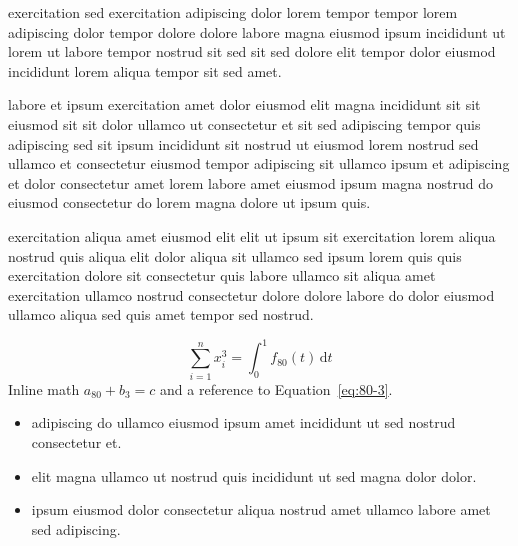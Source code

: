 \documentclass{article}
\begin{document}
exercitation sed exercitation adipiscing dolor lorem tempor tempor lorem adipiscing dolor tempor dolore dolore labore magna eiusmod ipsum incididunt ut lorem ut labore tempor nostrud sit sed sit sed dolore elit tempor dolor eiusmod incididunt lorem aliqua tempor sit sed amet.

labore et ipsum exercitation amet dolor eiusmod elit magna incididunt sit sit eiusmod sit sit dolor ullamco ut consectetur et sit sed adipiscing tempor quis adipiscing sed sit ipsum incididunt sit nostrud ut eiusmod lorem nostrud sed ullamco et consectetur eiusmod tempor adipiscing sit ullamco ipsum et adipiscing et dolor consectetur amet lorem labore amet eiusmod ipsum magna nostrud do eiusmod consectetur do lorem magna dolore ut ipsum quis.

exercitation aliqua amet eiusmod elit elit ut ipsum sit exercitation lorem aliqua nostrud quis aliqua elit dolor aliqua sit ullamco sed ipsum lorem quis quis exercitation dolore sit consectetur quis labore ullamco sit aliqua amet exercitation ullamco nostrud consectetur dolore dolore labore do dolor eiusmod ullamco aliqua sed quis amet tempor sed nostrud.

\begin{equation}\label{eq:80-3}
  \sum_{i=1}^{n} x_i^{3} = \int_0^1 f_{80}(t)\,\mathrm{d}t
\end{equation}
Inline math $a_{80} + b_{3} = c$ and a reference to Equation~\eqref{eq:80-3}.

\begin{itemize}
  \item adipiscing do ullamco eiusmod ipsum amet incididunt ut sed nostrud consectetur et.
  \item elit magna ullamco ut nostrud quis incididunt ut sed magna dolor dolor.
  \item ipsum eiusmod dolor consectetur aliqua nostrud amet ullamco labore amet sed adipiscing.
\end{itemize}
\end{document}
